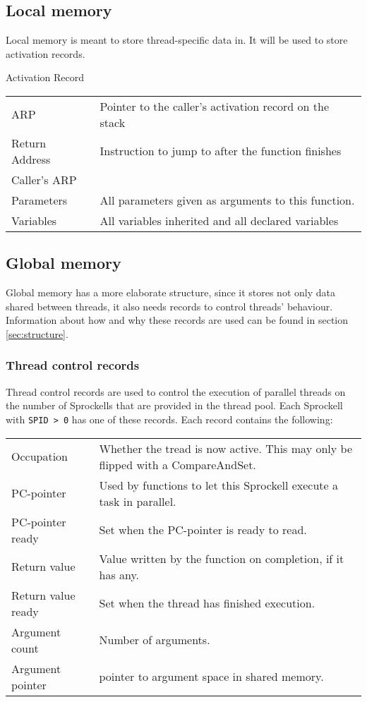 \documentclass[10pt,a4paper]{report}
\begin{document}
\subsection{Local memory}
Local memory is meant to store thread-specific data in. It will be used to store activation records. 

\label{fig:actrecord}
Activation Record
 
\begin{tabular}{| l | l |}
\hline
	ARP
		& Pointer to the caller's activation record on the stack \\	

	Return Address
		& Instruction to jump to after the function finishes \\
	
	Caller's ARP 	
		& \\
	
	Parameters 
		& All parameters given as arguments to this function. \\
	
	Variables 
		& All variables inherited and all declared variables \\	
\hline
\end{tabular}

\subsection{Global memory}
Global memory has a more elaborate structure, since it stores not only data shared between threads, it also needs records to control threads' behaviour. Information about how and why these records are used can be found in section \ref{sec:structure}. 

\subsubsection{Thread control records}
Thread control records are used to control the execution of parallel threads on the number of Sprockells that are provided in the thread pool. Each Sprockell with \texttt{SPID > 0} has one of these records. Each record contains the following:

\begin{tabular}{| l | l |}
\hline
Occupation 
	& Whether the tread is now active. This may only be flipped with a CompareAndSet. \\
PC-pointer 
	& Used by functions to let this Sprockell execute a task in parallel. \\
PC-pointer ready 
	& Set when the PC-pointer is ready to read. \\
Return value 
	& Value written by the function on completion, if it has any. \\
Return value ready 
	& Set when the thread has finished execution. \\
Argument count 
	& Number of arguments. \\
Argument pointer 
	& pointer to argument space in shared memory. \\ 
\hline
\end{tabular}
\end{document}
